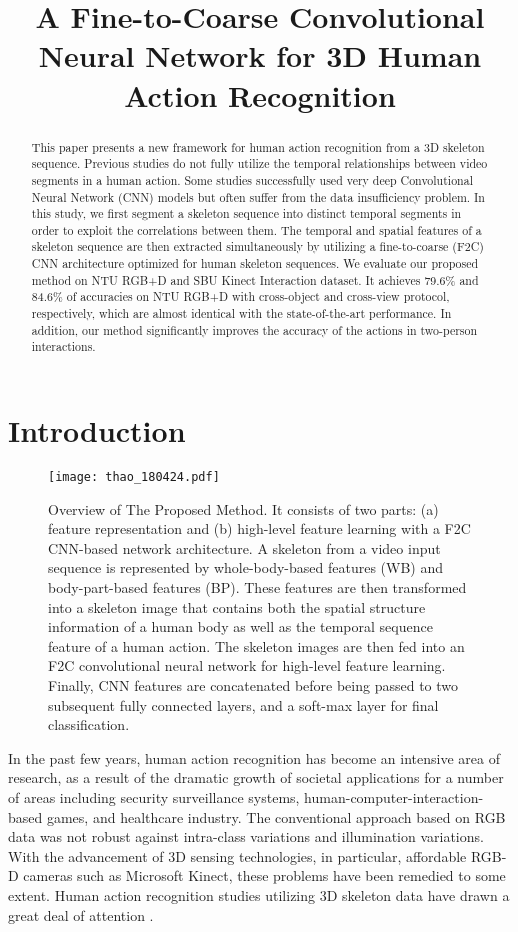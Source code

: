 \documentclass{bmvc2k}
\title{A Fine-to-Coarse Convolutional Neural Network for 3D Human Action Recognition}
\begin{document}
\maketitle

\begin{abstract}
This paper presents a new framework for human action recognition from a 3D skeleton sequence. Previous studies do not fully utilize the temporal relationships between video segments in a human action. Some studies successfully used very deep Convolutional Neural Network (CNN) models but often suffer from the data insufficiency problem. In this study, we first segment a skeleton sequence into distinct temporal segments in order to exploit the correlations between them. The temporal and spatial features of a skeleton sequence are then extracted simultaneously by utilizing a fine-to-coarse (F2C) CNN architecture optimized for human skeleton sequences. We evaluate our proposed method on NTU RGB+D and SBU Kinect Interaction dataset. It achieves 79.6\% and 84.6\% of accuracies on NTU RGB+D with cross-object and cross-view protocol, respectively, which are almost identical with the state-of-the-art performance. In addition, our method significantly improves the accuracy of the actions in two-person interactions.
\end{abstract}

\section{Introduction}
	\label{sec:intro}

\begin{figure}[t!]
	\centering
	\texttt{[image: thao\_180424.pdf]}
	\caption{Overview of The Proposed Method. It consists of two parts: (a) feature representation and (b) high-level feature learning with a F2C CNN-based network architecture. A skeleton from a video input sequence is represented by whole-body-based features (WB) and body-part-based features (BP). These features are then transformed into a skeleton image that contains both the spatial structure information of a human body as well as the temporal sequence feature of a human action. The skeleton images are then fed into an F2C convolutional neural network for high-level feature learning. Finally, CNN features are concatenated before being passed to two subsequent fully connected layers, and a soft-max layer for final classification.}
	\label{fig:network_arch}
\end{figure}
In the past few years, human action recognition has become an intensive area of research, as a result of the dramatic growth of societal applications for a number of areas including security surveillance systems, human-computer-interaction-based games, and healthcare industry. The conventional approach based on RGB data was not robust against intra-class variations and illumination variations. With the advancement of 3D sensing technologies, in particular, affordable RGB-D cameras such as Microsoft Kinect, these problems have been remedied to some extent. Human action recognition studies utilizing 3D skeleton data have drawn a great deal of attention \cite{han2017space, presti20163d}.
\end{document}
